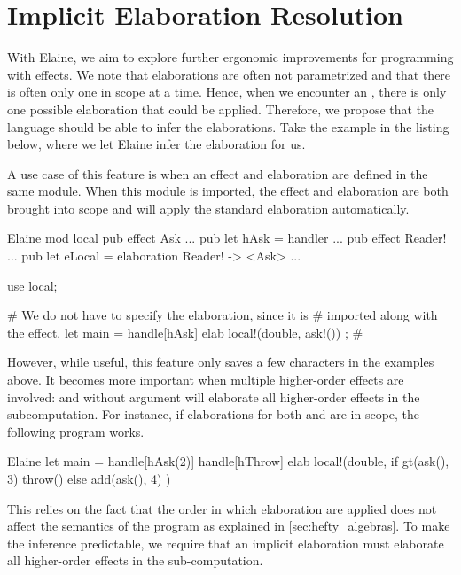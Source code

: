 \chapter{Implicit Elaboration Resolution}\label{chap:elabres}

With Elaine, we aim to explore further ergonomic improvements for programming with effects. We note that elaborations are often not parametrized and that there is often only one in scope at a time. Hence, when we encounter an \elab, there is only one possible elaboration that could be applied. Therefore, we propose that the language should be able to infer the elaborations. Take the example in the listing below, where we let Elaine infer the elaboration for us.


A use case of this feature is when an effect and elaboration are defined in the same module. When this module is imported, the effect and elaboration are both brought into scope and  will apply the standard elaboration automatically.

\begin{lst}{Elaine}
mod local {
    pub effect Ask { ... }
    pub let hAsk = handler { ... }
    pub effect Reader! { ... }
    pub let eLocal = elaboration Reader! -> <Ask> { ... }
}

use local;

# We do not have to specify the elaboration, since it is
# imported along with the effect.
let main = handle[hAsk] elab { local!(double, ask!()) };
#                          ^^^
\end{lst}

However, while useful, this feature only saves a few characters in the examples above. It becomes more important when multiple higher-order effects are involved: and  without argument will elaborate all higher-order effects in the subcomputation. For instance, if elaborations for both  and  are in scope, the following program works.

\begin{lst}{Elaine}
let main = handle[hAsk(2)] handle[hThrow] elab {
    local!(double, {
        if gt(ask(), 3) {
            throw() 
        } else {
            add(ask(), 4)
        }
    })
}
\end{lst}

This relies on the fact that the order in which elaboration are applied does not affect the semantics of the program as explained in \cref{sec:hefty_algebras}. To make the inference predictable, we require that an implicit elaboration must elaborate all higher-order effects in the sub-computation.

